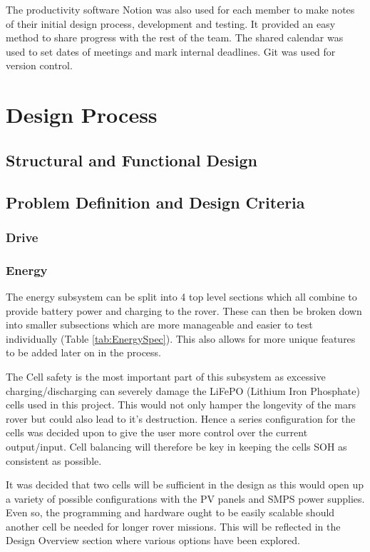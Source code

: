 \documentclass[10pt,twoside]{article}
\begin{document}
The productivity software Notion was also used for each member to make notes of their initial design process, development and testing. It provided an easy method to share progress with the rest of the team. The shared calendar was used to set dates of meetings and mark internal deadlines. 
Git was used for version control.
\newpage
\section{Design Process}
\subsection{Structural and Functional Design}
\subsection{Problem Definition and Design Criteria}

\subsubsection{Drive}

\subsubsection{Energy}
The energy subsystem can be split into 4 top level sections which all combine to provide battery power and charging to the rover. These can then be broken down into smaller subsections which are more manageable and easier to test individually (Table \ref{tab:EnergySpec}). This also allows for more unique features to be added later on in the process. 

The Cell safety is the most important part of this subsystem as excessive charging/discharging can severely damage the LiFePO (Lithium Iron Phosphate) cells used in this project. This would not only hamper the longevity of the mars rover but could also lead to it's destruction. Hence a series configuration for the cells was decided upon to give the user more control over the current output/input. Cell balancing will therefore be key in keeping the cells SOH as consistent as possible.

It was decided that two cells will be sufficient in the design as this would open up a variety of possible configurations with the PV panels and SMPS power supplies. Even so, the programming and hardware ought to be easily scalable should another cell be needed for longer rover missions. This will be reflected in the Design Overview section where various options have been explored. 
  
\end{document}
